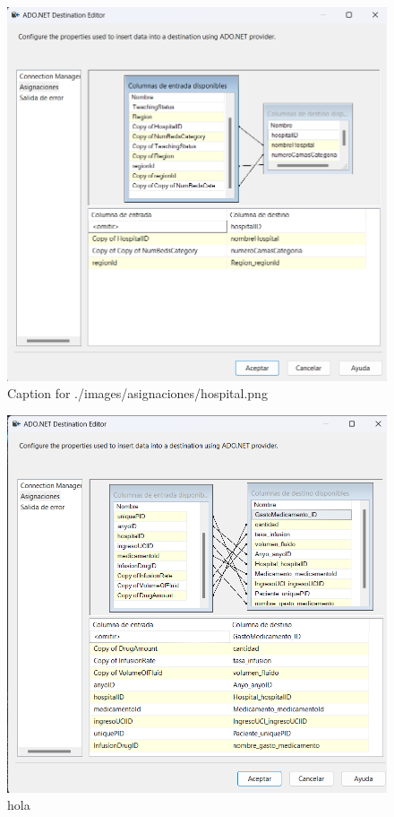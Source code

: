 \documentclass{article}
\begin{document}
\begin{figure}[H]
  \centering
  \includegraphics[width=\linewidth]{./images/asignaciones/hospital.png}
  \caption{Caption for ./images/asignaciones/hospital.png}
\end{figure}
\begin{figure}[H]
  \centering
  \includegraphics[width=\linewidth]{./images/asignaciones/gasto_medicamento.png}
  \caption{hola}
\end{figure}
\end{document}
